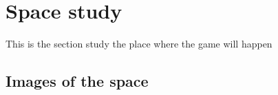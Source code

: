 
\section{Space study}

This is the section study the place where the game will happen

\subsection{Images of the space}

\ShowSpacePhotos

